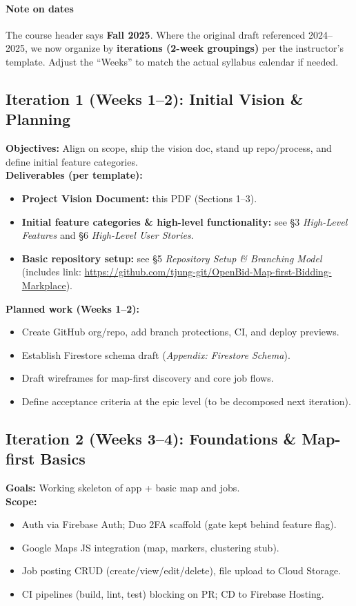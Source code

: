 \documentclass[11pt]{article}
\newcommand{\repoURL}{https://github.com/tjung-git/OpenBid-Map-first-Bidding-Markplace}
\begin{document}
\paragraph{Note on dates}
The course header says \textbf{Fall 2025}. Where the original draft referenced 2024--2025, we now organize by \textbf{iterations (2-week groupings)} per the instructor’s template. Adjust the “Weeks” to match the actual syllabus calendar if needed.

\subsection*{Iteration 1 (Weeks 1--2): Initial Vision \& Planning}
\textbf{Objectives:} Align on scope, ship the vision doc, stand up repo/process, and define initial feature categories. \\
\textbf{Deliverables (per template):}
\begin{itemize}[leftmargin=1.4em]
  \item \textbf{Project Vision Document:} this PDF (Sections 1--3).
  \item \textbf{Initial feature categories \& high-level functionality:} see \S3 \emph{High-Level Features} and \S6 \emph{High-Level User Stories}.
  \item \textbf{Basic repository setup:} see \S5 \emph{Repository Setup \& Branching Model} (includes link: \href{\repoURL}{\repoURL}).
\end{itemize}
\textbf{Planned work (Weeks 1--2):}
\begin{itemize}[leftmargin=1.4em]
  \item Create GitHub org/repo, add branch protections, CI, and deploy previews.
  \item Establish Firestore schema draft (\emph{Appendix: Firestore Schema}).
  \item Draft wireframes for map-first discovery and core job flows.
  \item Define acceptance criteria at the epic level (to be decomposed next iteration).
\end{itemize}

\subsection*{Iteration 2 (Weeks 3--4): Foundations \& Map-first Basics}
\textbf{Goals:} Working skeleton of app + basic map and jobs. \\
\textbf{Scope:}
\begin{itemize}[leftmargin=1.4em]
  \item Auth via Firebase Auth; Duo 2FA scaffold (gate kept behind feature flag).
  \item Google Maps JS integration (map, markers, clustering stub).
  \item Job posting CRUD (create/view/edit/delete), file upload to Cloud Storage.
  \item CI pipelines (build, lint, test) blocking on PR; CD to Firebase Hosting.
\end{itemize}
\end{document}

